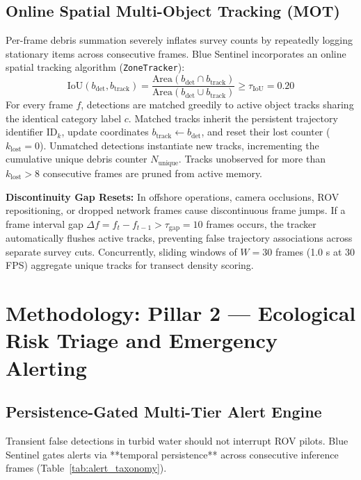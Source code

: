 \documentclass[conference]{IEEEtran}
\begin{document}
\subsection{Online Spatial Multi-Object Tracking (MOT)}
Per-frame debris summation severely inflates survey counts by repeatedly logging stationary items across consecutive frames. Blue Sentinel incorporates an online spatial tracking algorithm (\texttt{ZoneTracker}):
\begin{equation}
\text{IoU}(b_{\text{det}}, b_{\text{track}}) = \frac{\text{Area}(b_{\text{det}} \cap b_{\text{track}})}{\text{Area}(b_{\text{det}} \cup b_{\text{track}})} \ge \tau_{\text{IoU}} = 0.20
\label{eq:iou_track}
\end{equation}
For every frame $f$, detections are matched greedily to active object tracks sharing the identical category label $c$. Matched tracks inherit the persistent trajectory identifier $\text{ID}_k$, update coordinates $b_{\text{track}} \leftarrow b_{\text{det}}$, and reset their lost counter ($k_{\text{lost}} = 0$). Unmatched detections instantiate new tracks, incrementing the cumulative unique debris counter $N_{\text{unique}}$. Tracks unobserved for more than $k_{\text{lost}} > 8$ consecutive frames are pruned from active memory.

\textbf{Discontinuity Gap Resets:} In offshore operations, camera occlusions, ROV repositioning, or dropped network frames cause discontinuous frame jumps. If a frame interval gap $\Delta f = f_t - f_{t-1} > \tau_{\text{gap}} = 10$ frames occurs, the tracker automatically flushes active tracks, preventing false trajectory associations across separate survey cuts. Concurrently, sliding windows of $W = 30$ frames (1.0 s at 30 FPS) aggregate unique tracks for transect density scoring.

\section{Methodology: Pillar 2 --- Ecological Risk Triage and Emergency Alerting}

\subsection{Persistence-Gated Multi-Tier Alert Engine}
Transient false detections in turbid water should not interrupt ROV pilots. Blue Sentinel gates alerts via **temporal persistence** across consecutive inference frames (Table~\ref{tab:alert_taxonomy}).
\end{document}
